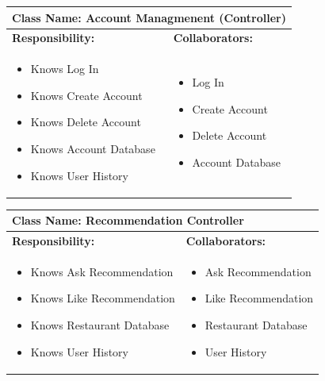 \documentclass[]{article}
\begin{document}

\begin{table}[H]
	\centering
	\begin{tabular}{|p{7cm}|p{7cm}|}
	\hline 
	 \multicolumn{2}{|l|}{\textbf{Class Name:} Account Managmenent (Controller)} \\
	\hline
	\textbf{Responsibility:} & \textbf{Collaborators:} \\
	\hline
	\raggedright
	\begin{itemize}
		\item Knows Log In
		\item Knows Create Account
		\item Knows Delete Account
		\item Knows Account Database
		\item Knows User History
	\end{itemize}
	\vspace{1in} & 
	\begin{itemize}
		\item Log In
		\item Create Account
		\item Delete Account
		\item Account Database
	\end{itemize} \\
	\hline
	\end{tabular}
\end{table}

\begin{table}[H]
	\centering
	\begin{tabular}{|p{7cm}|p{7cm}|}
	\hline 
	 \multicolumn{2}{|l|}{\textbf{Class Name:} Recommendation Controller }\\
	\hline
	\textbf{Responsibility:} & \textbf{Collaborators:} \\
	\hline
	\raggedright
	\begin{itemize}
		\item Knows Ask Recommendation
		\item Knows Like Recommendation
		\item Knows Restaurant Database
		\item Knows User History
	\end{itemize}
	\vspace{1in} & 
	\begin{itemize}
		\item Ask Recommendation
		\item Like Recommendation
		\item Restaurant Database
		\item User History
	\end{itemize} \\
	\hline
	\end{tabular}
\end{table}
\end{document}
